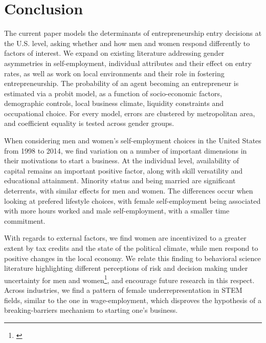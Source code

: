 
\chapter{Conclusion\label{ch:conclusion}}

The current paper models the determinants of entrepreneurship entry decisions at the U.S. level, asking whether and how men and women respond differently to factors of interest. We expand on existing literature addressing gender asymmetries in self-employment, individual attributes and their effect on entry rates, as well as work on local environments and their role in fostering entrepreneurship. The probability of an agent becoming an entrepreneur is estimated via a probit model, as a function of socio-economic factors, demographic controls, local business climate, liquidity constraints and occupational choice. For every model, errors are clustered by metropolitan area, and coefficient equality is tested across gender groups.

When considering men and women's self-employment choices in the United States from 1998 to 2014, we find variation on a number of important dimensions in their motivations to start a business. At the individual level, availability of capital remains an important positive factor, along with skill versatility and educational attainment. Minority status and being married are significant deterrents, with similar effects for men and women. The differences occur when looking at prefered lifestyle choices, with female self-employment being associated with more hours worked and male self-employment, with a smaller time commitment. 

With regards to external factors, we find women are incentivized to a greater extent by tax credits and the state of the political climate, while men respond to positive changes in the local economy. We relate this finding to behavioral science literature highlighting different perceptions of risk and decision making under uncertainty for men and women\footnote{\cite{adams2012beyond}\cite{koellinger2013gender}}, and encourage future research in this respect. Across industries, we find a pattern of female underrepresentation in STEM fields, similar to the one in wage-employment, which disproves the hypothesis of a breaking-barriers mechanism to starting one's business. 

